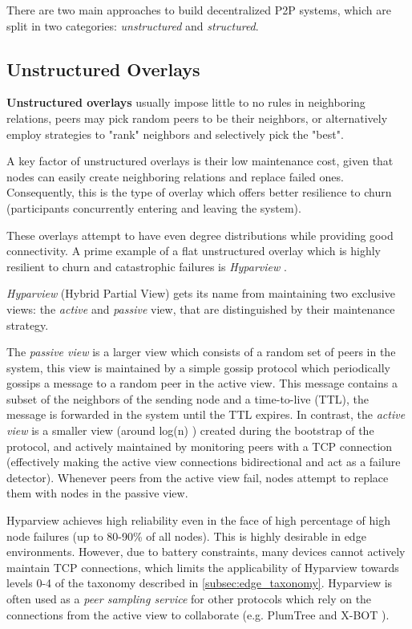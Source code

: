 There are two main approaches to build decentralized P2P systems, which are split in two categories: \textit{unstructured} and \textit{structured}. 

\subsection{Unstructured Overlays}

\textbf{Unstructured overlays} usually impose little to no rules in neighboring relations, peers may pick random peers to be their neighbors, or alternatively employ strategies to "rank" neighbors and selectively pick the "best".

A key factor of unstructured overlays is their low maintenance cost, given that nodes can easily create neighboring relations and replace failed ones. Consequently, this is the type of overlay which offers better resilience to churn \cite{stutzbach2006understanding} (participants concurrently entering and leaving the system).

These overlays attempt to have even degree distributions while providing good connectivity. A prime example of a flat unstructured overlay which is highly resilient to churn and catastrophic failures is \textit{Hyparview} \cite{Hyparview}. 

\textit{Hyparview} (Hybrid Partial View) gets its name from maintaining two exclusive views: the \textit{active} and \textit{passive} view, that are distinguished by their maintenance strategy. 

The \textit{passive view} is a larger view which consists of a random set of peers in the system, this view is maintained by a simple gossip protocol which periodically gossips a message to a random peer in the active view. This message contains a subset of the neighbors of the sending node and a time-to-live (TTL), the message is forwarded in the system until the TTL expires. In contrast, the \textit{active view} is a smaller view (around log(n) ) created during the bootstrap of the protocol, and actively maintained by monitoring peers with a TCP connection (effectively making the active view connections bidirectional and act as a failure detector). Whenever peers from the active view fail, nodes attempt to replace them with nodes in the passive view.

Hyparview achieves high reliability even in the face of high percentage of high node failures (up to 80-90\% of all nodes). This is highly desirable in edge environments. However, due to battery constraints, many devices cannot actively maintain TCP connections, which limits the applicability of Hyparview towards levels 0-4 of the taxonomy described in \ref{subsec:edge_taxonomy}. Hyparview is often used as a \textit{peer sampling service} for other protocols which rely on the connections from the active view to collaborate  (e.g. PlumTree \cite{leitao2007epidemic} and X-BOT \cite{leitao2012x}).

